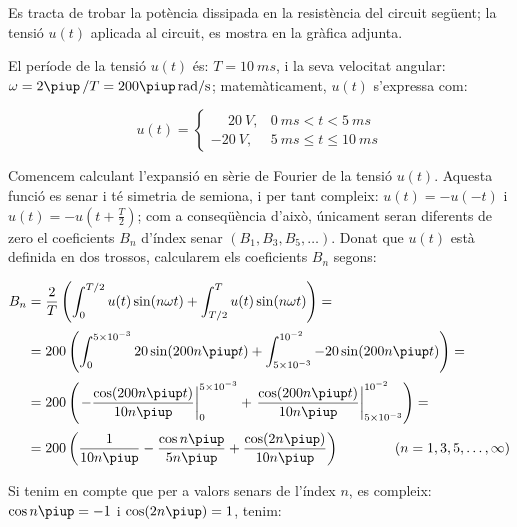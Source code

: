\begin{exemple}\label{ex:fourier}
     Es tracta de trobar la potència
     dissipada en la resistència del circuit següent; la tensió $u(t)$ aplicada al circuit,
     es mostra en la gràfica adjunta.

    \begin{center}
        
    \end{center}

     El període de la tensió $u(t)$ és: $T=\SI{10}{ms}$, i la
    seva velocitat angular: $\omega = 2\piup\,/T = 200\piup\unit{rad/s}$;
    matemàticament, $u(t)$ s'expressa com:

    \[
    u(t) = \begin{cases} \phantom{-}\SI{20}{V}, & \SI{0}{ms} < t < \SI{5}{ms} \\
           \SI{-20}{V}, & \SI{5}{ms} \leq t \leq \SI{10}{ms} \end{cases}
    \]

    Comencem calculant l'expansió en sèrie de Fourier de la tensió
    $u(t)$. Aquesta funció es senar i té simetria de semiona, i per tant
     compleix: $u(t)=-u(-t)$ i $u(t) = -u(t+\frac{T}{2})$; com a
    conseqüència d'això, únicament seran diferents de zero el
    coeficients $B_n$ d'índex senar $(B_1,B_3,B_5,\ldots)$. Donat que
    $u(t)$ està definida en dos trossos, calcularem els coeficients
    $B_n$ segons:

    \[
    \begin{split}
        B_n &= \frac{2}{T} \left( \int_0^{T/2} u(t) \sin(n \omega t) +
        \int_{T/2}^{T} u(t) \sin(n \omega t) \right) =\\[0.5ex]
        &= 200 \left( \int_0^{5\times 10^{-3}} 20 \sin(200 n \piup t) +
        \int_{5\times 10^{-3}}^{10^{-2}} -20 \sin(200 n \piup t) \right) =\\[0.5ex]
        &= 200 \left( \left. -\frac{\cos(200 n \piup t)}{10 n \piup}\right|_0^{5\times 10^{-3}}
        +  \left.\frac{\cos(200 n \piup t)}{10 n \piup}\right|_{5\times
        10^{-3}}^{10^{-2}}\right)=\\[0.5ex]
        &= 200\left( \frac{1}{10 n \piup} - \frac{\cos n \piup}{5 n \piup} +
        \frac{\cos (2 n \piup)}{10 n \piup}\right)
        \qquad\qquad(n=1,3,5,\ldots,\infty)
    \end{split}
    \]

    Si tenim en compte que per a valors senars de l'índex $n$, es
    compleix: $\cos n \piup = -1$ i $\cos (2 n \piup) = 1$, tenim:


\end{exemple}
